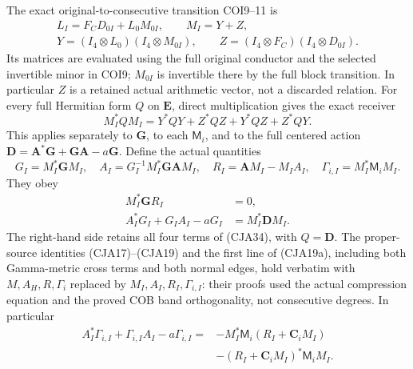 The exact original-to-consecutive transition COI9--11 is
\begin{equation}
 \begin{gathered}
 L_I=F_CD_{0I}+L_0M_{0I},\qquad M_I=Y+Z,\\
 Y=(I_4\otimes L_0)(I_4\otimes M_{0I}),\qquad
 Z=(I_4\otimes F_C)(I_4\otimes D_{0I}).
 \end{gathered}
 \tag{CJA33}
\end{equation}
Its matrices are evaluated using the full original conductor and
the selected invertible minor in COI9; \(M_{0I}\) is invertible
there by the full block transition.
In particular \(Z\) is a retained actual arithmetic vector, not
a discarded relation.
For every full Hermitian form \(Q\) on \(\mathbf E\), direct
multiplication gives the exact receiver
\begin{equation}
 M_I^*QM_I=Y^*QY+Z^*QZ+Y^*QZ+Z^*QY .
 \tag{CJA34}
\end{equation}
This applies separately to \(\mathbf G\), to each \(\mathsf M_i\),
and to the full centered action
\(\mathbf D=\mathbf A^*\mathbf G+\mathbf G\mathbf A-a\mathbf G\).
Define the actual quantities
\[
 G_I=M_I^*\mathbf GM_I,\quad
 A_I=G_I^{-1}M_I^*\mathbf G\mathbf AM_I,\quad
 R_I=\mathbf AM_I-M_IA_I,\quad
 \Gamma_{i,I}=M_I^*\mathsf M_iM_I.
 \]
They obey
\begin{equation}
 \begin{split}
 M_I^*\mathbf GR_I&=0,\\
 A_I^*G_I+G_IA_I-aG_I&=M_I^*\mathbf DM_I .
 \end{split}
 \tag{CJA35}
\end{equation}
The right-hand side retains all four terms of (CJA34), with
\(Q=\mathbf D\).
The proper-source identities (CJA17)--(CJA19) and the first line
of (CJA19a), including both
Gamma-metric cross terms and both normal edges, hold verbatim
with \(M,A_H,R,\Gamma_i\) replaced by
\(M_I,A_I,R_I,\Gamma_{i,I}\): their proofs used the actual
compression equation and the proved COB band orthogonality,
not consecutive degrees.
In particular
\[
 \begin{split}
 A_I^*\Gamma_{i,I}+\Gamma_{i,I}A_I-a\Gamma_{i,I}
 ={}&-M_I^*\mathsf M_i(R_I+\boldsymbol C_iM_I)\\
    &-(R_I+\boldsymbol C_iM_I)^*\mathsf M_iM_I .
 \end{split}
 \]

